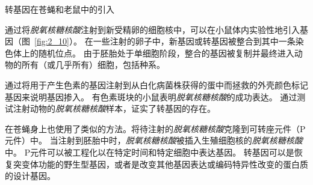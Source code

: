 \begin{proposition}[神经解剖学导航术语] \label{box:2_3}
	
	\quad \quad 转基因在苍蝇和老鼠中的引入
	
	\quad \quad 通过将\textit{脱氧核糖核酸}注射到新受精卵的细胞核中，可以在小鼠体内实验性地引入基因（图~\ref{fig:2_10}）。
	在一些注射的卵子中，新基因或转基因被整合到其中一条染色体上的随机位点。
	由于胚胎处于单细胞阶段，整合的基因被复制并最终进入动物的所有（或几乎所有）细胞，包括种系。
	
	\quad \quad 通过将用于产生色素的基因注射到从白化病菌株获得的蛋中而拯救的外壳颜色标记基因来说明基因掺入。
	有色素斑块的小鼠表明\textit{脱氧核糖核酸}的成功表达。
	通过测试注射动物的\textit{脱氧核糖核酸}样本，证实了转基因的存在。
	
	\quad \quad 在苍蝇身上也使用了类似的方法。将待注射的\textit{脱氧核糖核酸}克隆到可转座元件（P元件）中。
	当注射到胚胎中时，\textit{脱氧核糖核酸}被插入生殖细胞核的\textit{脱氧核糖核酸}中。
	P元件可以被工程化以在特定时间和特定细胞中表达基因。
	转基因可以是恢复突变体功能的野生型基因，或者是改变其他基因表达或编码特异性改变的蛋白质的设计基因。
	
\end{proposition}


